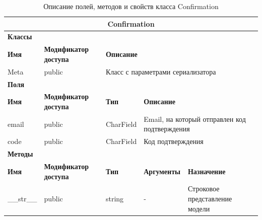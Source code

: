 \documentclass{../includes/TechDoc}
\begin{document}
    \begin{table}[ht]
        \caption{\label{tab:class-Confirmation-table}Описание полей, методов и свойств класса Confirmation}
        \centering
        \begin{tabular}{|p{3.2cm}|p{3cm}|p{2.9cm}|p{2.9cm}|p{4cm}|}
            \hline
            \multicolumn{5}{|c|}{Confirmation} \\ \hline
            \multicolumn{5}{|l|}{\textbf{Классы}} \\ \hline
            \textbf{Имя} & \textbf{Модификатор доступа} & \multicolumn{3}{p{9.8cm}|}{\textbf{Описание}} \\ \hline
            Meta & public & \multicolumn{3}{p{9.8cm}|}{Класс с параметрами сериализатора} \\ \hline
            \multicolumn{5}{|l|}{\textbf{Поля}} \\ \hline
            \textbf{Имя} & \textbf{Модификатор доступа} & \textbf{Тип} & \multicolumn{2}{p{6.9cm}|}{\textbf{Описание}} \\ \hline
            email & public & CharField & \multicolumn{2}{p{6.9cm}|}{Email, на который отправлен код подтверждения} \\ \hline
            code & public & CharField & \multicolumn{2}{p{6.9cm}|}{Код подтверждения} \\ \hline
            \multicolumn{5}{|l|}{\textbf{Методы}} \\ \hline
            \textbf{Имя} & \textbf{Модификатор доступа} & \textbf{Тип} & \textbf{Аргументы} & \textbf{Назначение} \\ \hline
            \_\_str\_\_ & public & string & - & Строковое представление модели \\ \hline
        \end{tabular}
    \end{table}
\end{document}
